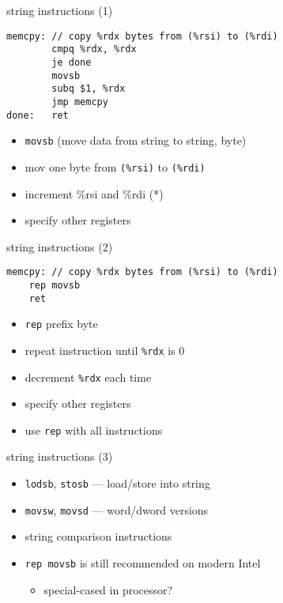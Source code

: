 
\begin{frame}[fragile,label=string1]{string instructions (1)}
\begin{lstlisting}[style=small]
memcpy: // copy %rdx bytes from (%rsi) to (%rdi)
        cmpq %rdx, %rdx
        je done
        movsb
        subq $1, %rdx
        jmp memcpy
done:   ret
\end{lstlisting}
\begin{itemize}
\item {\tt movsb} (move data from string to string, byte)
\item mov one byte from {\tt (\%rsi)} to {\tt (\%rdi)}
\item increment \%rsi and \%rdi (*)
\item {} specify other registers
\end{itemize}
\end{frame}

\begin{frame}[fragile,label=string2]{string instructions (2)}
\begin{lstlisting}[style=small]
memcpy: // copy %rdx bytes from (%rsi) to (%rdi)
    rep movsb
    ret
\end{lstlisting}
\begin{itemize}
\item {\tt rep} prefix byte
\vspace{.5cm}
\item repeat instruction until {\tt \%rdx} is 0
\item decrement {\tt \%rdx} each time
\item {} specify other registers
\item {} use {\tt rep} with all instructions
\end{itemize}
\end{frame}

\begin{frame}{string instructions (3)}
\begin{itemize}
\item {\tt lodsb}, {\tt stosb} --- load/store into string
\item {\tt movsw}, {\tt movsd} --- word/dword versions
\item string comparison instructions
\vspace{.5cm}
\item {\tt rep movsb} is still recommended on modern Intel
    \begin{itemize}
    \item special-cased in processor?
    \end{itemize}
\end{itemize}
\end{frame}


